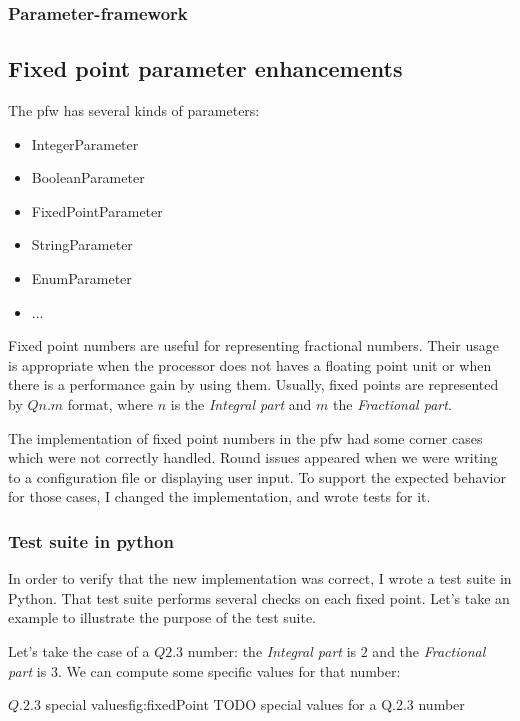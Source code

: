 \subsubsection{Parameter-framework}

\subsection{Fixed point parameter enhancements}
The \gls{pfw} has several kinds of parameters:
\begin{itemize}
    \item IntegerParameter
    \item BooleanParameter
    \item FixedPointParameter
    \item StringParameter
    \item EnumParameter
    \item ...
\end{itemize}

Fixed point numbers are useful for representing fractional numbers. Their
usage is appropriate when the processor does not haves a floating point unit
or when there is a performance gain by using them. Usually, fixed points are
represented by $Qn.m$ format, where $n$ is the \emph{Integral part} and $m$ the
\emph{Fractional part}.

The implementation of fixed point numbers in the \gls{pfw} had some
corner cases which were not correctly handled. Round issues appeared when we
were writing to a configuration file or displaying user input. To
support the expected behavior for those cases, I changed the implementation, and
wrote tests for it.

\subsubsection{Test suite in python}

In order to verify that the new implementation was correct, I wrote a test suite
in Python. That test suite performs several checks on each fixed point. Let's
take an example to illustrate the purpose of the test suite.

Let's take the case of a $Q2.3$ number: the \emph{Integral part} is $2$ and the
\emph{Fractional part} is $3$. We can compute some specific values for that number:

\begin{figureGraphics}{$Q.2.3$ special values}{fig:fixedPoint}
    TODO special values for a Q.2.3 number
\end{figureGraphics}

